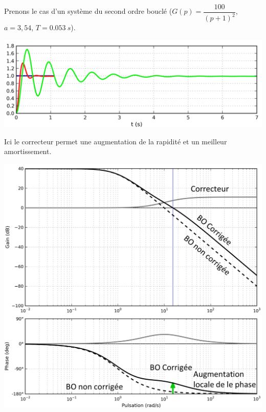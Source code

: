 \documentclass[10pt,fleqn]{article} %
\begin{document}
\noindent
\begin{minipage}[c]{.46\linewidth}
Prenons le cas d'un système du second ordre bouclé ($G(p)=\dfrac{100}{\left(p+1\right)^2}$, $a=3,54$, $T=\SI{0,053}{s}$).

\begin{center}
\includegraphics[width=\linewidth]{images/Avance_BF}

\end{center}
Ici le correcteur permet une augmentation de la rapidité et un meilleur amortissement.
\end{minipage} \hfill
\begin{minipage}[c]{.46\linewidth}
\begin{center}
\includegraphics[width=\linewidth]{images/Avance_Bode}

\end{center}
\end{minipage} 
\end{document}
